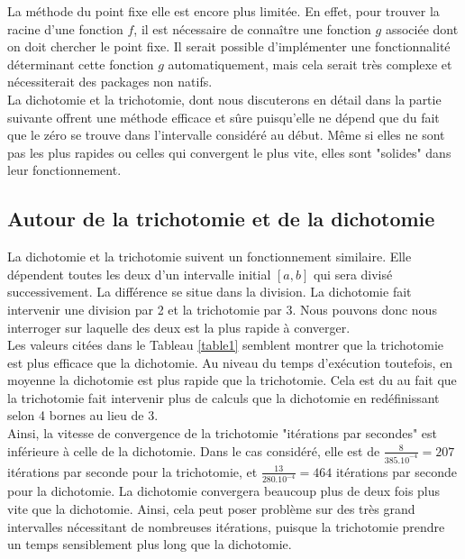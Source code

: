\documentclass[12pt]{article}
\begin{document}
\noindent La méthode du point fixe elle est encore plus limitée. En effet, pour trouver la racine d'une fonction $f$, il est nécessaire de connaître une fonction $g$ associée dont on doit chercher le point fixe. Il serait possible d'implémenter une fonctionnalité déterminant cette fonction $g$ automatiquement, mais cela serait très complexe et nécessiterait des packages non natifs.\\

\noindent La dichotomie et la trichotomie, dont nous discuterons en détail dans la partie suivante offrent une méthode efficace et sûre puisqu'elle ne dépend que du fait que le zéro se trouve dans l'intervalle considéré au début. Même si elles ne sont pas les plus rapides ou celles qui convergent le plus vite, elles sont "solides" dans leur fonctionnement.

\subsection{Autour de la trichotomie et de la dichotomie}
\noindent La dichotomie et la trichotomie suivent un fonctionnement similaire. Elle dépendent toutes les deux d'un intervalle initial $[a,b]$ qui sera divisé successivement. La différence se situe dans la division. La dichotomie fait intervenir une division par 2 et la trichotomie par 3. Nous pouvons donc nous interroger sur laquelle des deux est la plus rapide à converger.\\

\noindent Les valeurs citées dans le Tableau \ref{table1} semblent montrer que la trichotomie est plus efficace que la dichotomie. Au niveau du temps d'exécution toutefois, en moyenne la dichotomie est plus rapide que la trichotomie. Cela est du au fait que la trichotomie fait intervenir plus de calculs que la dichotomie en redéfinissant selon 4 bornes au lieu de 3.\\
Ainsi, la vitesse de convergence de la trichotomie "itérations par secondes" est inférieure à celle de la dichotomie. Dans le cas considéré, elle est de $\frac{8}{385.10^{-4}} = 207$ itérations par seconde pour la trichotomie, et $\frac{13}{280.10^{-4}} = 464$ itérations par seconde pour la dichotomie.  La dichotomie convergera beaucoup plus de deux fois plus vite que la dichotomie. Ainsi, cela peut poser problème sur des très grand intervalles nécessitant de nombreuses itérations, puisque la trichotomie prendre un temps sensiblement plus long que la dichotomie.

\end{document}
